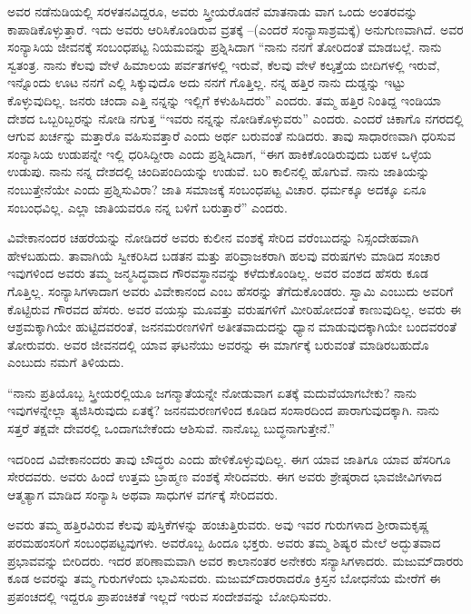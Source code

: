 ಅವರ ನಡೆನುಡಿಯಲ್ಲಿ ಸರಳತನವಿದ್ದರೂ, ಅವರು ಸ್ತ್ರೀಯರೊಡನೆ ಮಾತನಾಡು ವಾಗ ಒಂದು ಅಂತರವನ್ನು ಕಾಪಾಡಿಕೊಳ್ಳುತ್ತಾರೆ. ಇದು ಅವರು ಆರಿಸಿಕೊಂಡಿರುವ ವ್ರತಕ್ಕೆ –(ಎಂದರೆ ಸಂನ್ಯಾಸಾಶ್ರಮಕ್ಕೆ) ಅನುಗುಣವಾಗಿದೆ. ಅವರ ಸಂನ್ಯಾಸಿಯ ಜೀವನಕ್ಕೆ ಸಂಬಂಧಪಟ್ಟ ನಿಯಮವನ್ನು ಪ್ರಶ್ನಿಸಿದಾಗ “ನಾನು ನನಗೆ ತೋರಿದಂತೆ ಮಾಡಬಲ್ಲೆ. ನಾನು ಸ್ವತಂತ್ರ. ನಾನು ಕೆಲವು ವೇಳೆ ಹಿಮಾಲಯ ಪರ್ವತಗಳಲ್ಲಿ ಇರುವೆ, ಕೆಲವು ವೇಳೆ ಕಲ್ಕತ್ತೆಯ ಬೀದಿಗಳಲ್ಲಿ ಇರುವೆ, ಇನ್ನೊಂದು ಊಟ ನನಗೆ ಎಲ್ಲಿ ಸಿಕ್ಕುವುದೊ ಅದು ನನಗೆ ಗೊತ್ತಿಲ್ಲ. ನನ್ನ ಹತ್ತಿರ ನಾನು ದುಡ್ಡನ್ನು ಇಟ್ಟು ಕೊಳ್ಳುವುದಿಲ್ಲ. ಜನರು ಚಂದಾ ಎತ್ತಿ ನನ್ನನ್ನು ಇಲ್ಲಿಗೆ ಕಳುಹಿಸಿದರು” ಎಂದರು. ತಮ್ಮ ಹತ್ತಿರ ನಿಂತಿದ್ದ ಇಂಡಿಯಾ ದೇಶದ ಒಬ್ಬರಿಬ್ಬರನ್ನು ನೋಡಿ ನಗುತ್ತ “ಇವರು ನನ್ನನ್ನು ನೋಡಿಕೊಳ್ಳುವರು” ಎಂದರು. ಎಂದರೆ ಚಿಕಾಗೊ ನಗರದಲ್ಲಿ ಆಗುವ ಖರ್ಚನ್ನು ಮತ್ತಾರೊ ವಹಿಸುವತ್ತಾರೆ ಎಂದು ಅರ್ಥ ಬರುವಂತೆ ನುಡಿದರು. ತಾವು ಸಾಧಾರಣವಾಗಿ ಧರಿಸುವ ಸಂನ್ಯಾಸಿಯ ಉಡುಪನ್ನೇ ಇಲ್ಲಿ ಧರಿಸಿದ್ದೀರಾ ಎಂದು ಪ್ರಶ್ನಿಸಿದಾಗ, “ಈಗ ಹಾಕಿಕೊಂಡಿರುವುದು ಬಹಳ ಒಳ್ಳೆಯ ಉಡುಪು. ನಾನು ನನ್ನ ದೇಶದಲ್ಲಿ ಚಿಂದಿಪಂದಿಯನ್ನು ಉಡುವೆ. ಬರಿ ಕಾಲಿನಲ್ಲಿ ಹೊಗುವೆ. ನಾನು ಜಾತಿಯನ್ನು ನಂಬುತ್ತೇನೆಯೇ ಎಂದು ಪ್ರಶ್ನಿಸುವಿರಾ? ಜಾತಿ ಸಮಾಜಕ್ಕೆ ಸಂಬಂಧಪಟ್ಟ ವಿಚಾರ. ಧರ್ಮಕ್ಕೂ ಅದಕ್ಕೂ ಏನೂ ಸಂಬಂಧವಿಲ್ಲ. ಎಲ್ಲಾ ಜಾತಿಯವರೂ ನನ್ನ ಬಳಿಗೆ ಬರುತ್ತಾರೆ” ಎಂದರು.

ವಿವೇಕಾನಂದರ ಚಹರೆಯನ್ನು ನೋಡಿದರೆ ಅವರು ಕುಲೀನ ವಂಶಕ್ಕೆ ಸೇರಿದ ವರೆಂಬುದನ್ನು ನಿಸ್ಸಂದೇಹವಾಗಿ ಹೇಳಬಹುದು. ತಾವಾಗಿಯೆ ಸ್ವೀಕರಿಸಿದ ಬಡತನ ಮತ್ತು ಪರಿವ್ರಾಜಕರಾಗಿ ಹಲವು ವರುಷಗಳು ಮಾಡಿದ ಸಂಚಾರ ಇವುಗಳಿಂದ ಅವರು ತಮ್ಮ ಜನ್ಮಸಿದ್ಧವಾದ ಗೌರವಸ್ಥಾನವನ್ನು ಕಳೆದುಕೊಂಡಿಲ್ಲ. ಅವರ ವಂಶದ ಹೆಸರು ಕೂಡ ಗೊತ್ತಿಲ್ಲ. ಸಂನ್ಯಾಸಿಗಳಾದಾಗ ಅವರು ವಿವೇಕಾನಂದ ಎಂಬ ಹೆಸರನ್ನು ತೆಗೆದುಕೊಂಡರು. ಸ್ವಾಮಿ ಎಂಬುದು ಅವರಿಗೆ ಕೊಟ್ಟಿರುವ ಗೌರವದ ಹೆಸರು. ಅವರ ವಯಸ್ಸು ಮೂವತ್ತು ವರುಷಗಳಿಗೆ ಮೀರಿಹೋದಂತೆ ಕಾಣುವುದಿಲ್ಲ. ಅವರು ಈ ಆಶ್ರಮಕ್ಕಾಗಿಯೇ ಹುಟ್ಟಿದವರಂತೆ, ಜನನಮರಣಗಳಿಗೆ ಅತೀತವಾದುದನ್ನು ಧ್ಯಾನ ಮಾಡುವುದಕ್ಕಾಗಿಯೇ ಬಂದವರಂತೆ ತೋರುವರು. ಅವರ ಜೀವನದಲ್ಲಿ ಯಾವ ಘಟನೆಯು ಅವರನ್ನು ಈ ಮಾರ್ಗಕ್ಕೆ ಬರುವಂತೆ ಮಾಡಿರಬಹುದೊ ಎಂಬುದು ನಮಗೆ ತಿಳಿಯದು.

“ನಾನು ಪ್ರತಿಯೊಬ್ಬ ಸ್ತ್ರೀಯರಲ್ಲಿಯೂ ಜಗನ್ಮಾತೆಯನ್ನೇ ನೋಡುವಾಗ ಏತಕ್ಕೆ ಮದುವೆಯಾಗಬೇಕು? ನಾನು ಇವುಗಳನ್ನೇಲ್ಲಾ ತ್ಯಜಿಸಿರುವುದು ಏತಕ್ಕೆ? ಜನನಮರಣಗಳಿಂದ ಕೂಡಿದ ಸಂಸಾರದಿಂದ ಪಾರಾಗುವುದಕ್ಕಾಗಿ. ನಾನು ಸತ್ತರೆ ತಕ್ಷವೇ ದೇವರಲ್ಲಿ ಒಂದಾಗಬೇಕೆಂದು ಆಶಿಸುವೆ. ನಾನೊಬ್ಬ ಬುದ್ಧನಾಗುತ್ತೇನೆ.”

ಇದರಿಂದ ವಿವೇಕಾನಂದರು ತಾವು ಬೌದ್ಧರು ಎಂದು ಹೇಳಿಕೊಳ್ಳುವುದಿಲ್ಲ. ಈಗ ಯಾವ ಜಾತಿಗೂ ಯಾವ ಹೆಸರಿಗೂ ಸೇರದವರು. ಅವರು ಹಿಂದೆ ಉತ್ತಮ ಬ್ರಾಹ್ಮಣ ವಂಶಕ್ಕೆ ಸೇರಿದವರು. ಈಗ ಅವರು ಶ್ರೇಷ್ಠರಾದ ಭಾವಜೀವಿಗಳಾದ ಆತ್ಮತ್ಯಾಗ ಮಾಡಿದ ಸಂನ್ಯಾಸಿ ಅಥವಾ ಸಾಧುಗಳ ವರ್ಗಕ್ಕೆ ಸೇರಿದವರು.

ಅವರು ತಮ್ಮ ಹತ್ತಿರವಿರುವ ಕೆಲವು ಪುಸ್ತಿಕೆಗಳನ್ನು ಹಂಚುತ್ತಿರುವರು. ಅವು ಇವರ ಗುರುಗಳಾದ ಶ‍್ರೀರಾಮಕೃಷ್ಣ ಪರಮಹಂಸರಿಗೆ ಸಂಬಂಧಪಟ್ಟವುಗಳು. ಅವರೊಬ್ಬ ಹಿಂದೂ ಭಕ್ತರು. ಅವರು ತಮ್ಮ ಶಿಷ್ಯರ ಮೇಲೆ ಅದ್ಭುತವಾದ ಪ್ರಭಾವವನ್ನು ಬೀರಿದರು. ಇದರ ಪರಿಣಾಮವಾಗಿ ಅವರ ಕಾಲಾನಂತರ ಅನೇಕರು ಸನ್ಯಾಸಿಗಳಾದರು. ಮಜುಮ್​ದಾರರು ಕೂಡ ಅವರನ್ನು ತಮ್ಮ ಗುರುಗಳೆಂದು ಭಾವಿಸುವರು. ಮಜುಮ್​ದಾರರಾದರೊ ಕ್ರಿಸ್ತನ ಬೋಧನೆಯ ಮೇರೆಗೆ ಈ ಪ್ರಪಂಚದಲ್ಲಿ ಇದ್ದರೂ ಪ್ರಾಪಂಚಿಕತೆ ಇಲ್ಲದೆ ಇರುವ ಸಂದೇಶವನ್ನು ಬೋಧಿಸುವರು.

